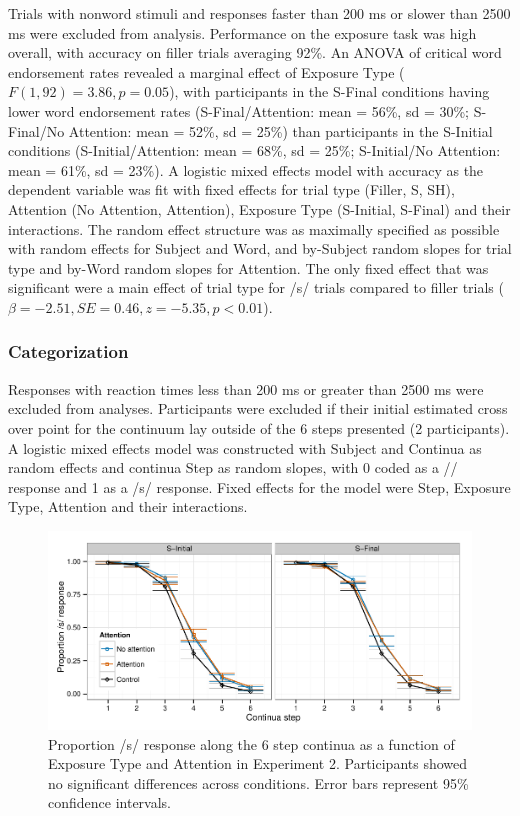 Trials with nonword stimuli and responses faster than 200 ms or slower than 2500 ms were excluded from analysis. 
Performance on the exposure task was high overall, with accuracy on filler trials averaging 92\%.  
An ANOVA of critical word endorsement rates revealed a marginal effect of Exposure Type ($F(1,92) = 3.86, p = 0.05$), with participants in the S-Final conditions having lower word endorsement rates (S-Final/Attention: mean = 56\%, sd = 30\%; S-Final/No Attention: mean = 52\%, sd = 25\%) than participants in the S-Initial conditions (S-Initial/Attention: mean = 68\%, sd = 25\%; S-Initial/No Attention: mean = 61\%, sd = 23\%).
A logistic mixed effects model with accuracy as the dependent variable was fit with fixed effects for trial type (Filler, S, SH), Attention (No Attention, Attention), Exposure Type (S-Initial, S-Final) and their interactions. 
The random effect structure was as maximally specified as possible with random effects for Subject and Word, and by-Subject random slopes for trial type and by-Word random slopes for Attention. 
The only fixed effect that was significant were a main effect of trial type for /s/ trials compared to filler trials ($\beta = -2.51, SE = 0.46, z = -5.35, p < 0.01$).

\subsubsection{Categorization}

Responses with reaction times less than 200 ms or greater than 2500 ms were excluded from analyses. 
Participants were excluded if their initial estimated cross over point for the continuum lay outside of the 6 steps presented (2 participants).  
A logistic mixed effects model was constructed with Subject and Continua as random effects and continua Step as random slopes, with 0 coded as a /\textesh/ response and 1 as a /s/ response.  Fixed effects for the model were Step, Exposure Type, Attention and their interactions.

\begin{figure}[!ht]
\caption{Proportion /s/ response along the 6 step continua as a function of Exposure Type and Attention in Experiment 2.  Participants showed no significant differences across conditions. Error bars represent 95\% confidence intervals.}
\label{fig:exp2categ}
\begin{center}
\includegraphics[width=\textwidth]{graphs/exp2_categresults}
\end{center}
\end{figure}

